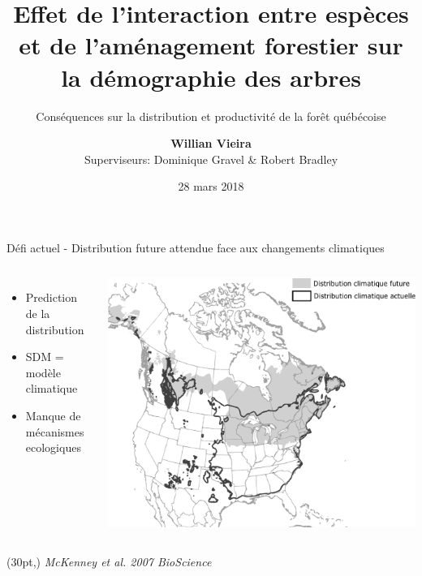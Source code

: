 \documentclass[11pt, compress, aspectratio=1610]{beamer}
\title{Effet de l’interaction entre espèces et de l’aménagement forestier sur
la démographie des arbres}
\subtitle{Conséquences sur la distribution et productivité de la forêt québécoise}
\date{28 mars 2018}
\author{\textbf{Willian Vieira}\\
Superviseurs: Dominique Gravel \& Robert Bradley \newline}
\institute{}
\newcommand\smallcitation[1]{%
\begin{textblock*}{\textwidth}(30pt,\textheight)
	\raggedleft \footnotesize\textit{#1}
\end{textblock*}}
\providecommand{\tightlist}{%
  \setlength{\itemsep}{0pt}\setlength{\parskip}{0pt}}
\newcommand{\begincols}{\begin{columns}}
\newcommand{\stopcols}{\end{columns}}
\begin{document}
\maketitle

\begin{frame}{Défi actuel - Distribution future attendue face aux
changements climatiques}
\protect\hypertarget{duxe9fi-actuel---distribution-future-attendue-face-aux-changements-climatiques}{}

\begincols
{}
  \begin{itemize}
  \tightlist
  \item
    Prediction de la distribution
  \item
    SDM = modèle climatique
  \item
    Manque de mécanismes ecologiques
\end{itemize}
\hfill{}
  \centering

\includegraphics[scale=0.4]{figures/mckenney.pdf}

\par
\stopcols

\smallcitation{McKenney \textit{et al}. 2007 BioScience}

\end{frame}
\end{document}
